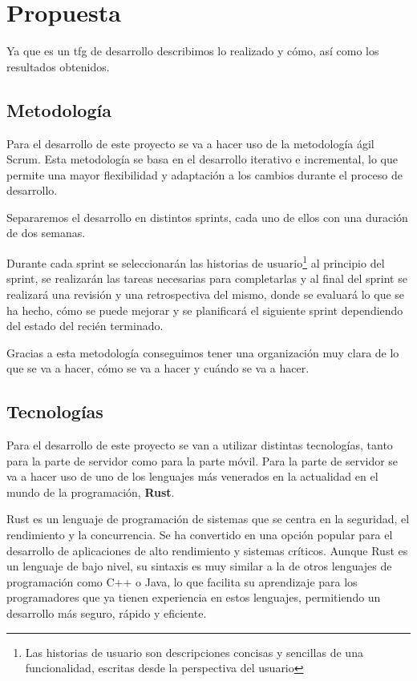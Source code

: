 \section{Propuesta}
Ya que es un tfg de desarrollo describimos lo realizado y cómo, así como los resultados obtenidos.

\subsection{Metodología}
Para el desarrollo de este proyecto se va a hacer uso de la metodología ágil Scrum. Esta metodología se basa en el desarrollo iterativo e incremental, lo que permite una mayor flexibilidad y adaptación a los cambios durante el proceso de desarrollo.

Separaremos el desarrollo en distintos sprints, cada uno de ellos con una duración de dos semanas.

Durante cada sprint se seleccionarán las historias de usuario\footnote{Las historias de usuario son descripciones concisas y sencillas de una funcionalidad, escritas desde la perspectiva del usuario} al principio del sprint, se realizarán las tareas necesarias para completarlas y al final del sprint se realizará una revisión y una retrospectiva del mismo, donde se evaluará lo que se ha hecho, cómo se puede mejorar y se planificará el siguiente sprint dependiendo del estado del recién terminado.

Gracias a esta metodología conseguimos tener una organización muy clara de lo que se va a hacer, cómo se va a hacer y cuándo se va a hacer.

\subsection{Tecnologías}
Para el desarrollo de este proyecto se van a utilizar distintas tecnologías, tanto para la parte de servidor como para la parte móvil.
Para la parte de servidor se va a hacer uso de uno de los lenguajes más venerados en la actualidad en el mundo de la programación, \textbf{Rust}.

Rust es un lenguaje de programación de sistemas que se centra en la seguridad, el rendimiento y la concurrencia. Se ha convertido en una opción popular para el desarrollo de aplicaciones de alto rendimiento y sistemas críticos.
Aunque Rust es un lenguaje de bajo nivel, su sintaxis es muy similar a la de otros lenguajes de programación como C++ o Java, lo que facilita su aprendizaje para los programadores que ya tienen experiencia en estos lenguajes, permitiendo un desarrollo más seguro, rápido y eficiente. 

